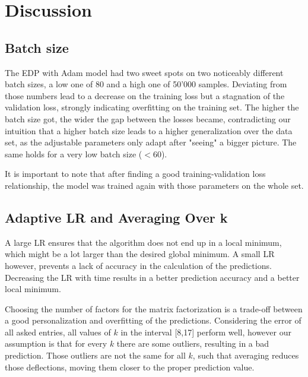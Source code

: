 \section{Discussion}
\label{sec:discussion}


\subsection{Batch size}
The \ac{EDP} with Adam model had two sweet spots on two noticeably different batch sizes, a low one of 80 and a high one of 50'000 samples. Deviating from those numbers lead to a decrease on the training loss but a stagnation of the validation loss, strongly indicating overfitting on the training set. The higher the batch size got, the wider the gap between the losses became, contradicting our intuition that a higher batch size leads to a higher generalization over the data set, as the adjustable parameters only adapt after "seeing" a bigger picture. The same holds for a very low batch size ($< 60$).

It is important to note that after finding a good training-validation loss relationship, the model was trained again with those parameters on the whole set.

\subsection{Adaptive \ac{LR} and Averaging Over k}

A large \ac{LR} ensures that the algorithm does not end up in a local minimum, which might be a lot larger than the desired global minimum. A small \ac{LR} however, prevents a lack of accuracy in the calculation of the predictions. Decreasing the \ac{LR} with time results in a better prediction accuracy and a better local minimum.

Choosing the number of factors for the matrix factorization is a trade-off between a good personalization and overfitting of the predictions. Considering the error of all asked entries, all values of $k$ in the interval [8,17] perform well, however our assumption is that for every $k$ there are some outliers, resulting in a bad prediction. Those outliers are not the same for all $k$, such that averaging reduces those deflections, moving them closer to the proper prediction value.

